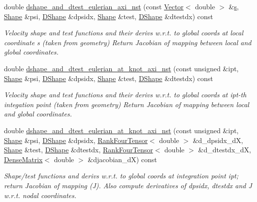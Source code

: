 \begin{DoxyCompactItemize}
\item 
double \hyperlink{classoomph_1_1AxisymmetricTCrouzeixRaviartElement_a0ee2d8653afb290ec3215e976f34830d}{dshape\+\_\+and\+\_\+dtest\+\_\+eulerian\+\_\+axi\+\_\+nst} (const \hyperlink{classoomph_1_1Vector}{Vector}$<$ double $>$ \&\hyperlink{cfortran_8h_ab7123126e4885ef647dd9c6e3807a21c}{s}, \hyperlink{classoomph_1_1Shape}{Shape} \&psi, \hyperlink{classoomph_1_1DShape}{D\+Shape} \&dpsidx, \hyperlink{classoomph_1_1Shape}{Shape} \&test, \hyperlink{classoomph_1_1DShape}{D\+Shape} \&dtestdx) const
\begin{DoxyCompactList}\small\item\em Velocity shape and test functions and their derivs w.\+r.\+t. to global coords at local coordinate s (taken from geometry) Return Jacobian of mapping between local and global coordinates. \end{DoxyCompactList}\item 
double \hyperlink{classoomph_1_1AxisymmetricTCrouzeixRaviartElement_a7744f0666fd5005b65300843281efe81}{dshape\+\_\+and\+\_\+dtest\+\_\+eulerian\+\_\+at\+\_\+knot\+\_\+axi\+\_\+nst} (const unsigned \&ipt, \hyperlink{classoomph_1_1Shape}{Shape} \&psi, \hyperlink{classoomph_1_1DShape}{D\+Shape} \&dpsidx, \hyperlink{classoomph_1_1Shape}{Shape} \&test, \hyperlink{classoomph_1_1DShape}{D\+Shape} \&dtestdx) const
\begin{DoxyCompactList}\small\item\em Velocity shape and test functions and their derivs w.\+r.\+t. to global coords at ipt-\/th integation point (taken from geometry) Return Jacobian of mapping between local and global coordinates. \end{DoxyCompactList}\item 
double \hyperlink{classoomph_1_1AxisymmetricTCrouzeixRaviartElement_a63923a44d4da4e1720449521c82f1c42}{dshape\+\_\+and\+\_\+dtest\+\_\+eulerian\+\_\+at\+\_\+knot\+\_\+axi\+\_\+nst} (const unsigned \&ipt, \hyperlink{classoomph_1_1Shape}{Shape} \&psi, \hyperlink{classoomph_1_1DShape}{D\+Shape} \&dpsidx, \hyperlink{classoomph_1_1RankFourTensor}{Rank\+Four\+Tensor}$<$ double $>$ \&d\+\_\+dpsidx\+\_\+dX, \hyperlink{classoomph_1_1Shape}{Shape} \&test, \hyperlink{classoomph_1_1DShape}{D\+Shape} \&dtestdx, \hyperlink{classoomph_1_1RankFourTensor}{Rank\+Four\+Tensor}$<$ double $>$ \&d\+\_\+dtestdx\+\_\+dX, \hyperlink{classoomph_1_1DenseMatrix}{Dense\+Matrix}$<$ double $>$ \&djacobian\+\_\+dX) const
\begin{DoxyCompactList}\small\item\em Shape/test functions and derivs w.\+r.\+t. to global coords at integration point ipt; return Jacobian of mapping (J). Also compute derivatives of dpsidx, dtestdx and J w.\+r.\+t. nodal coordinates. \end{DoxyCompactList}\item 

\end{DoxyCompactItemize}

